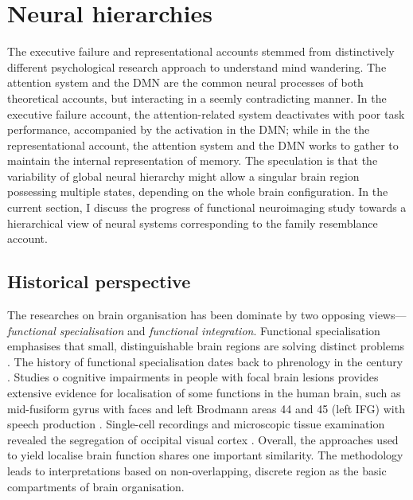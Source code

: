 \section{Neural hierarchies}
\label{ch:intro:neural}

The executive failure and representational accounts stemmed from distinctively different psychological research approach to understand mind wandering. The attention system and the DMN are the common neural processes of both theoretical accounts, but interacting in a seemly contradicting manner. In the executive failure account, the attention-related system deactivates with poor task performance, accompanied by the activation in the DMN; while in the the representational account, the attention system and the DMN works to gather to maintain the internal representation of memory. The speculation is that the variability of global neural hierarchy might allow a singular brain region possessing multiple states, depending on the whole brain configuration. In the current section, I discuss the progress of functional neuroimaging study towards a hierarchical view of neural systems corresponding to the family resemblance account.

\subsection{Historical perspective}

The researches on brain organisation has been dominate by two opposing views---\textit{functional specialisation} and \textit{functional integration}. Functional specialisation emphasises that small, distinguishable brain regions are solving distinct problems \cite{Kanwisher2010}. The history of functional specialisation dates back to phrenology in the  century \cite<for more history about functional localisation, see supporting information in >{Kanwisher2010}. Studies o cognitive impairments in people with focal brain lesions provides extensive evidence for localisation of some functions in the human brain, such as mid-fusiform gyrus with faces \cite{Iaria2008} and left Brodmann areas 44 and 45 (left IFG) with speech production \cite{Broca1861}. Single-cell recordings and microscopic tissue examination revealed the segregation of occipital visual cortex \cite{Zeki1978}. Overall, the approaches used to yield localise brain function shares one important similarity. The methodology leads to interpretations based on non-overlapping, discrete region as the basic compartments of brain organisation. 

